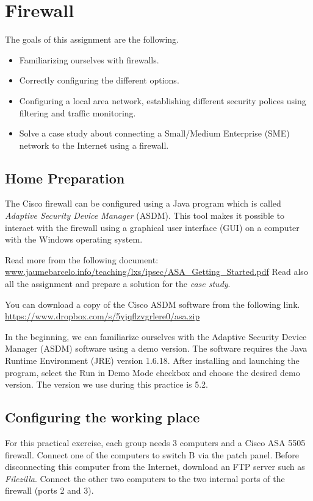 \chapter{Firewall}

The goals of this assignment are the following.

\begin{itemize}
\item Familiarizing ourselves with firewalls.
\item Correctly configuring the different options.
\item Configuring a local area network, establishing different security polices using filtering and traffic monitoring.
\item Solve a case study about connecting a Small/Medium Enterprise (SME) network to the Internet using a firewall.
\end{itemize}

\section{Home Preparation}

The Cisco firewall can be configured using a Java program which is called \emph{Adaptive Security Device Manager} (ASDM). This tool makes it possible to interact with the firewall using a graphical user interface (GUI) on a computer with the Windows operating system.

Read more from the following document:
\url{www.jaumebarcelo.info/teaching/lxs/ipsec/ASA_Getting_Started.pdf}
Read also all the assignment and prepare a solution for the \emph{case study}.

You can download a copy of the Cisco ASDM software from the following link.
\url{https://www.dropbox.com/s/5yjqflzvgrlere0/asa.zip}

In the beginning, we can familiarize ourselves with the Adaptive Security Device Manager (ASDM) software using a demo version. The software requires the Java Runtime Environment (JRE) version 1.6.18. After installing and launching the program, select the {\sf Run in Demo Mode} checkbox and choose the desired demo version. The version we use during this practice is 5.2.

\section{Configuring the working place}

For this practical exercise, each group needs 3 computers and a Cisco ASA 5505 firewall. Connect one of the computers to switch B via the patch panel. Before disconnecting this computer from the Internet, download an FTP server such as \emph{Filezilla}. Connect the other two computers to the two internal ports of the firewall (ports 2 and 3).

